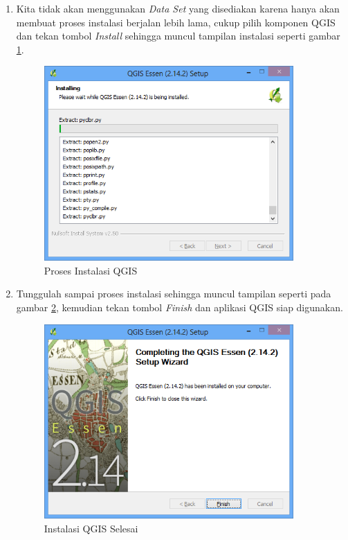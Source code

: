 \begin{enumerate}[A.]
\begin{enumerate}[1.]
\item Kita tidak akan menggunakan \textit{Data Set} yang disediakan karena hanya akan membuat proses instalasi berjalan lebih lama, cukup pilih komponen QGIS dan tekan tombol \textit{Install} sehingga muncul tampilan instalasi seperti gambar \ref{fig:prosesinstalasi}.

\begin{figure}
  \centering
  \includegraphics[width=0.9\textwidth]{./resources/install-win/006-installing}
  \caption{Proses Instalasi QGIS}
  \label{fig:prosesinstalasi}
\end{figure}

\item Tunggulah sampai proses instalasi sehingga muncul tampilan seperti pada gambar \ref{fig:finishinstalasi}, kemudian tekan tombol \textit{Finish} dan aplikasi QGIS siap digunakan.

\begin{figure}
  \centering
  \includegraphics[width=0.9\textwidth]{./resources/install-win/007-finished}
  \caption{Instalasi QGIS Selesai}
  \label{fig:finishinstalasi}
\end{figure}


\end{enumerate}
\end{enumerate}
